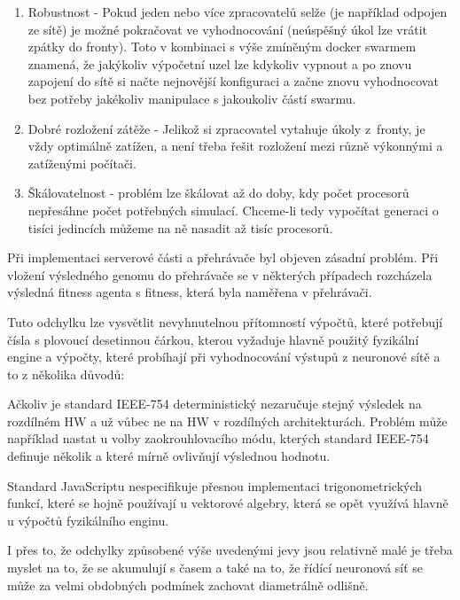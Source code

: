 \begin{enumerate}
	\item Robustnost - Pokud jeden nebo více zpracovatelů selže (je například odpojen ze sítě) je možné pokračovat ve vyhodnocování (neúspěšný úkol lze vrátit zpátky do fronty). Toto v kombinaci s výše zmíněným docker swarmem znamená, že jakýkoliv výpočetní uzel lze kdykoliv vypnout a po znovu zapojení do sítě si načte nejnovější konfiguraci a začne znovu vyhodnocovat bez potřeby jakékoliv manipulace s jakoukoliv částí swarmu.
	\item Dobré rozložení zátěže - Jelikož si zpracovatel vytahuje úkoly z~fronty, je vždy optimálně zatížen, a není třeba řešit rozložení mezi různě výkonnými a zatíženými počítači.
	\item Škálovatelnost - problém lze škálovat až do doby, kdy počet procesorů nepřesáhne počet potřebných simulací. Chceme-li tedy vypočítat generaci o tisíci jedincích můžeme na ně nasadit až tisíc procesorů.
\end{enumerate}



\label{sec:ImplementationTroubles}
Při implementaci serverové části a přehrávače byl objeven zásadní problém. Při vložení výsledného genomu do přehrávače se v některých případech rozcházela výsledná fitness agenta s fitness, která byla naměřena v přehrávači. 

Tuto odchylku lze vysvětlit nevyhnutelnou přítomností výpočtů, které potřebují čísla s plovoucí desetinnou čárkou, kterou vyžaduje hlavně použitý fyzikální engine a výpočty, které probíhají při vyhodnocování výstupů z neuronové sítě a to z několika důvodů:

Ačkoliv je standard IEEE-754 deterministický nezaručuje stejný výsledek na rozdílném HW a už vůbec ne na HW v rozdílných architekturách. Problém může například nastat u volby zaokrouhlovacího módu, kterých standard IEEE-754 definuje několik a které mírně ovlivňují výslednou hodnotu.

Standard JavaScriptu nespecifikuje přesnou implementaci trigonometrických funkcí, které se hojně používají u vektorové algebry, která se opět využívá hlavně u výpočtů fyzikálního enginu.

I přes to, že odchylky způsobené výše uvedenými jevy jsou relativně malé je třeba myslet na to, že se akumulují s časem a také na to, že řídící neuronová síť se může za velmi obdobných podmínek zachovat diametrálně odlišně. 

